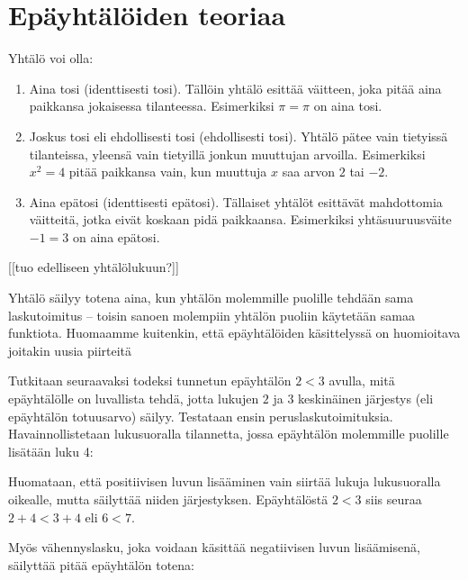 \section{Epäyhtälöiden teoriaa}

Yhtälö voi olla:

\begin{enumerate}
\item Aina tosi (identtisesti tosi). Tällöin yhtälö esittää väitteen, joka pitää aina paikkansa jokaisessa tilanteessa. Esimerkiksi $\pi=\pi$ on aina tosi.
\item Joskus tosi eli ehdollisesti tosi (ehdollisesti tosi). Yhtälö pätee vain tietyissä tilanteissa, yleensä vain tietyillä jonkun muuttujan arvoilla. Esimerkiksi $x^2=4$ pitää paikkansa vain, kun muuttuja $x$ saa arvon $2$ tai $-2$.
\item Aina epätosi (identtisesti epätosi). Tällaiset yhtälöt esittävät mahdottomia väitteitä, jotka eivät koskaan pidä paikkaansa. Esimerkiksi yhtäsuuruusväite $-1=3$ on aina epätosi.
\end{enumerate}

[[tuo edelliseen yhtälölukuun?]]


Yhtälö säilyy totena aina, kun yhtälön molemmille puolille tehdään sama laskutoimitus – toisin sanoen molempiin yhtälön puoliin käytetään samaa funktiota. Huomaamme kuitenkin, että epäyhtälöiden käsittelyssä on huomioitava joitakin uusia piirteitä

Tutkitaan seuraavaksi todeksi tunnetun epäyhtälön $2<3$ avulla, mitä epäyhtälölle on luvallista tehdä, jotta lukujen $2$ ja $3$ keskinäinen järjestys (eli epäyhtälön totuusarvo) säilyy. Testataan ensin peruslaskutoimituksia. Havainnollistetaan lukusuoralla tilannetta, jossa epäyhtälön molemmille puolille lisätään luku 4:

\begin{lukusuora}{-1}{10}{12}

\lukusuorauusi
\end{lukusuora}

Huomataan, että positiivisen luvun lisääminen vain siirtää lukuja lukusuoralla oikealle, mutta säilyttää niiden järjestyksen. Epäyhtälöstä $2<3$ siis seuraa $2+4<3+4$ eli $6<7$.

Myös vähennyslasku, joka voidaan käsittää negatiivisen luvun lisäämisenä, säilyttää pitää epäyhtälön totena:

